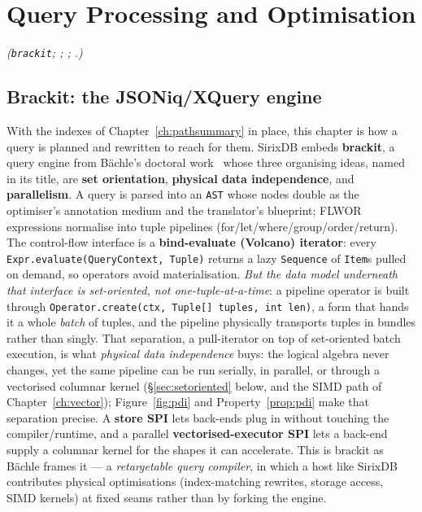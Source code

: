 \documentclass[11pt,a4paper,oneside]{report}
\theoremstyle{sirixthm}
\newcommand{\code}[1]{\texttt{#1}}
\begin{document}
\chapter{Query Processing and Optimisation}
\label{ch:query}

\noindent\textit{(\code{brackit}; ; ;
.)}

\section{Brackit: the JSONiq/XQuery engine}

With the indexes of Chapter~\ref{ch:pathsummary} in place, this chapter is how a query is
planned and rewritten to reach for them. SirixDB embeds \textbf{brackit}, a query engine from
B\"achle's doctoral work~\cite{baechle} whose three organising ideas, named in its title, are
\textbf{set orientation}, \textbf{physical data independence}, and \textbf{parallelism}. A query is parsed
into an \code{AST} whose nodes double as
the optimiser's annotation medium and the translator's blueprint; FLWOR expressions normalise
into tuple pipelines (for/let/where/group/order/return). The control-flow interface is a
\textbf{bind-evaluate (Volcano) iterator}: every \code{Expr.evaluate(QueryContext, Tuple)} returns a lazy
\code{Sequence} of \code{Item}s pulled on demand, so operators avoid materialisation. \emph{But the data
model underneath that interface is set-oriented, not one-tuple-at-a-time}: a pipeline operator is built
through \code{Operator.create(ctx, Tuple[] tuples, int len)}, a form that hands it a whole \emph{batch}
of tuples, and the pipeline physically transports tuples in bundles rather than singly. That separation,
a pull-iterator on top of set-oriented batch execution, is what \emph{physical data independence} buys:
the logical algebra never changes, yet the same pipeline can be run serially, in parallel, or through a
vectorised columnar kernel (\S\ref{sec:setoriented} below, and the SIMD path of
Chapter~\ref{ch:vector}); Figure~\ref{fig:pdi} and Property~\ref{prop:pdi} make that separation precise.
A \textbf{store SPI} lets back-ends plug in without touching the
compiler/runtime, and a parallel \textbf{vectorised-executor SPI} lets a back-end supply a columnar
kernel for the shapes it can accelerate. This is brackit as B\"achle frames it --- a \emph{retargetable
query compiler}, in which a host like SirixDB contributes physical optimisations (index-matching
rewrites, storage access, SIMD kernels) at fixed seams rather than by forking the engine.
\end{document}
